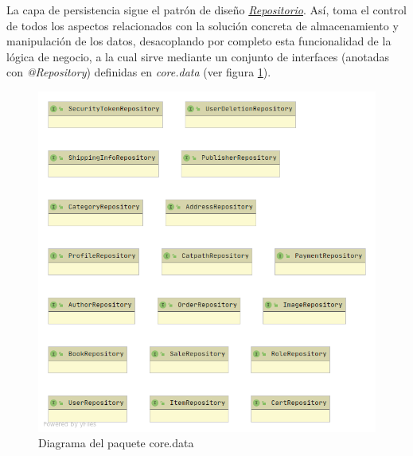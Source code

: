 \documentclass[a4paper]{article}
\begin{document}
   	La capa de persistencia sigue el patrón de diseño \href{https://thorben-janssen.com/implementing-the-repository-pattern-with-jpa-and-hibernate/}{\emph{Repositorio}}. Así, toma el control de todos los aspectos relacionados con la solución concreta de almacenamiento y manipulación de los datos, desacoplando por completo esta funcionalidad de la lógica de negocio, a la cual sirve mediante un conjunto de interfaces (anotadas con \emph{@Repository}) definidas en \emph{core.data} (ver figura \ref{fig:package_data}).
    	
   	\begin{figure}[htb!]
   		\centering
   		\includegraphics[width=\textwidth,keepaspectratio]{package_data}
   		\caption{Diagrama del paquete core.data}
   		\label{fig:package_data}
   	\end{figure}
   	
\end{document}
